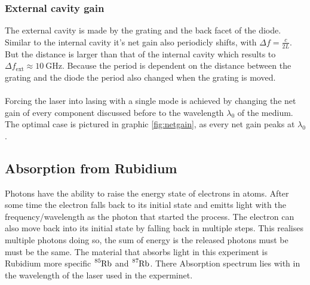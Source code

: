 \subsubsection{External cavity gain}
The external cavity is made by the grating and the back facet of the diode.
Similar to the internal cavity it's net gain also periodicly shifts, with $\Delta f = \frac{c}{2L}$.
\\
But the distance is larger than that of the internal cavity which results to $\Delta f_\text{ext} \approx \SI{10}{\giga\Hz}$.
Because the period is dependent on the distance between the grating and the diode the period also changed when the grating is moved.
\\\\
Forcing the laser into lasing with a single mode is achieved by changing the net gain of every component discussed before to the wavelength $\lambda_0$ of the medium.
The optimal case is pictured in graphic \ref{fig:netgain}, as every net gain peaks at $\lambda_0$.

\subsection{Absorption from Rubidium}
Photons have the ability to raise the energy state of electrons in atoms.
After some time the electron falls back to its initial state and emitts light with the frequency/wavelength as the photon that started the process.
The electron can also move back into its initial state by falling back in multiple steps.
This realises multiple photons doing so, the sum of energy is the released photons must be must be the same.
The material that absorbs light in this experiment is Rubidium more specific $\ce{^{85}Rb}$ and $\ce{^{87}Rb}$.
There Absorption spectrum lies with in the wavelength of the laser used in the experminet.